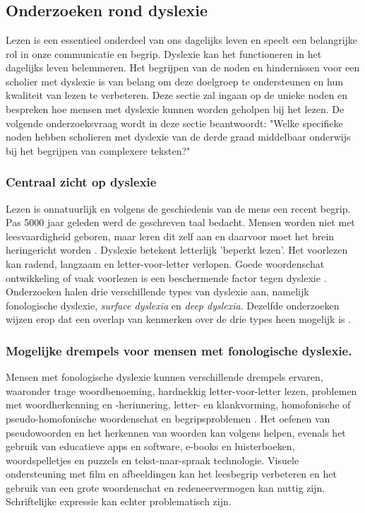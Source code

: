 \chapter{}%
\label{ch:stand-van-zaken}

\section{Onderzoeken rond dyslexie}
Lezen is een essentieel onderdeel van ons dagelijks leven en speelt een belangrijke rol in onze communicatie en begrip. Dyslexie kan het functioneren in het dagelijks leven belemmeren. Het begrijpen van de noden en hindernissen voor een scholier met dyslexie is van belang om deze doelgroep te ondersteunen en hun kwaliteit van lezen te verbeteren. Deze sectie zal ingaan op de unieke noden en bespreken hoe mensen met dyslexie kunnen worden geholpen bij het lezen. De volgende onderzoeksvraag wordt in deze sectie beantwoordt: "Welke specifieke noden hebben scholieren met dyslexie van de derde graad middelbaar onderwijs bij het begrijpen van complexere teksten?"

\subsection{Centraal zicht op dyslexie}
Lezen is onnatuurlijk en volgens de geschiedenis van de mens een recent begrip. Pas 5000 jaar geleden werd de geschreven taal bedacht. Mensen worden niet met leesvaardigheid geboren, maar leren dit zelf aan en daarvoor moet het brein heringericht worden \autocite{Bonte2020, VanDerMeer2022}. Dyslexie betekent letterlijk 'beperkt lezen'. Het voorlezen kan radend, langzaam en letter-voor-letter verlopen. Goede woordenschat ontwikkeling of vaak voorlezen is een beschermende factor tegen dyslexie \textcite{Vellutino2004, Bonte2020}. Onderzoeken halen drie verschillende types van dyslexie aan, namelijk fonologische dyslexie, \textit{surface dyslexia} en \textit{deep dyslexia}. Dezelfde onderzoeken wijzen erop dat een overlap van kenmerken over de drie types heen mogelijk is \autocite{Rello2012, Vellutino2004}.

\subsection{Mogelijke drempels voor mensen met fonologische dyslexie.}
Mensen met fonologische dyslexie kunnen verschillende drempels ervaren, waaronder trage woordbenoeming, hardnekkig letter-voor-letter lezen, problemen met woordherkenning en -herinnering, letter- en klankvorming, homofonische of pseudo-homofonische woordenschat en begripsproblemen \autocite{Bonte2020, RiveroContreras2021, Zhang2021}. Het oefenen van pseudowoorden en het herkennen van woorden kan volgens \textcite{Filipak2020} helpen, evenals het gebruik van educatieve apps en software, e-books en luisterboeken, woordspelletjes en puzzels en tekst-naar-spraak technologie. Visuele ondersteuning met film en afbeeldingen kan het leesbegrip verbeteren en het gebruik van een grote woordenschat en redeneervermogen kan nuttig zijn. Schriftelijke expressie kan echter problematisch zijn.

